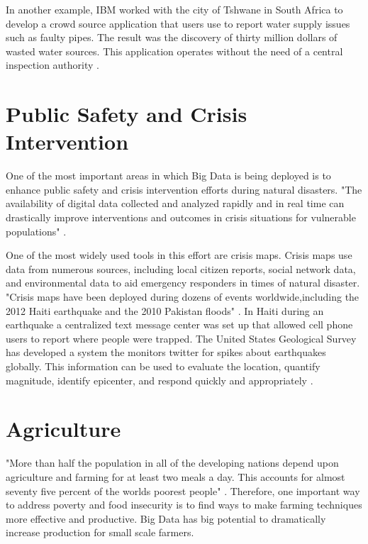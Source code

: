 \documentclass[sigconf]{acmart}
\begin{document}
In another example, IBM worked with the city of Tshwane in South Africa to develop a crowd source application that users use to report water supply issues such as faulty pipes. The result was the discovery of thirty million dollars of wasted water sources. This application operates without the need of a central inspection authority \cite{www-google-Hffpst}.

\section{Public Safety and Crisis Intervention}

One of the most important areas in which Big Data is being deployed is to enhance public safety and crisis intervention efforts during natural disasters. "The availability of digital data collected and analyzed rapidly and in real time can drastically improve interventions and outcomes in crisis situations for vulnerable populations" \cite{www-google-GloPls}.  

One of the most widely used tools in this effort are crisis maps. Crisis maps use data from numerous sources, including local citizen reports, social network data, and environmental data to aid emergency responders in times of natural disaster. "Crisis maps have been deployed during dozens of events worldwide,including the 2012 Haiti earthquake and the 2010 Pakistan floods" \cite{www-google-Hffpst}.
In Haiti during an earthquake a centralized text message center was set up that allowed cell phone users to report where people were trapped. The United States Geological Survey has developed a system the monitors twitter for spikes about earthquakes globally. This information can be used to evaluate the location, quantify magnitude, identify epicenter, and respond quickly and appropriately \cite{www-google-GloPls}.

\section{Agriculture}

"More than half the population in all of the developing nations depend upon agriculture and farming for at least two meals a day. This accounts for almost seventy five percent of the worlds poorest people" \cite{www-google-top10}.  Therefore, one important way to address poverty and food insecurity is to find ways to make farming techniques more effective and productive. Big Data has big potential to dramatically increase production for small scale farmers.
\end{document}
